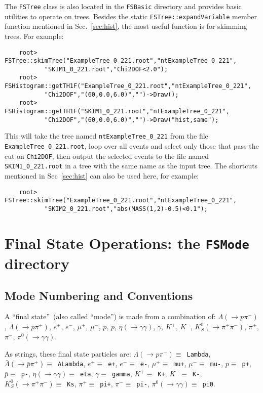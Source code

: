 \documentclass[11pt]{article}
\begin{document}
The {\tt FSTree} class is also located in the {\tt FSBasic} directory and provides basic utilities to operate on trees.  
Besides the static {\tt FSTree::expandVariable} member function mentioned in Sec.~\ref{sec:hist}, the most useful function is for skimming trees.  For example:
\begin{verbatim}
    root> FSTree::skimTree("ExampleTree_0_221.root","ntExampleTree_0_221",
           "SKIM1_0_221.root","Chi2DOF<2.0"); 
    root> FSHistogram::getTH1F("ExampleTree_0_221.root","ntExampleTree_0_221",
           "Chi2DOF","(60,0.0,6.0)","")->Draw();
    root> FSHistogram::getTH1F("SKIM1_0_221.root","ntExampleTree_0_221",
           "Chi2DOF","(60,0.0,6.0)","")->Draw("hist,same");
\end{verbatim}
This will take the tree named {\tt ntExampleTree\_0\_221} from the file {\tt ExampleTree\_0\_221.root}, loop over all events and select only those that pass the cut on {\tt Chi2DOF}, then output the selected events to the file named {\tt SKIM1\_0\_221.root} in a tree with the same name as the input tree.  The shortcuts mentioned in Sec~\ref{sec:hist} can also be used here, for example:
\begin{verbatim}
    root> FSTree::skimTree("ExampleTree_0_221.root","ntExampleTree_0_221",
           "SKIM2_0_221.root","abs(MASS(1,2)-0.5)<0.1"); 
\end{verbatim}


\section{Final State Operations:  the {\tt FSMode} directory}
\label{sec:modes}

\subsection{Mode Numbering and Conventions}
\label{sec:modeconv}

A ``final state''~(also called ``mode'') is made from a combination of: $\Lambda (\to p \pi^-)$, $\bar{\Lambda} (\to \bar{p} \pi^+)$, $e^+$, $e^-$, $\mu^+$, $\mu^-$, $p$, $\bar{p}$, $\eta (\to \gamma\gamma)$, $\gamma$, $K^+$, $K^-$, $K^0_S (\to \pi^+\pi^-)$, $\pi^+$, $\pi^-$, $\pi^0 (\to \gamma\gamma)$.

As strings, these final state particles are:
$\Lambda (\to p \pi^-) \equiv $~{\tt Lambda}, 
$\bar{\Lambda} (\to \bar{p} \pi^+) \equiv $~{\tt ALambda}, 
$e^+ \equiv $~{\tt e+}, 
$e^- \equiv $~{\tt e-}, 
$\mu^+ \equiv $~{\tt mu+},  
$\mu^- \equiv $~{\tt mu-}, 
$p \equiv $~{\tt p+}, 
$\bar{p} \equiv $~{\tt p-}, 
$\eta (\to \gamma\gamma) \equiv $~{\tt eta}, 
$\gamma \equiv $~{\tt gamma}, 
$K^+ \equiv $~{\tt K+}, 
$K^- \equiv $~{\tt K-}, 
$K^0_S (\to \pi^+\pi^-) \equiv $~{\tt Ks}, 
$\pi^+ \equiv $~{\tt pi+}, 
$\pi^- \equiv $~{\tt pi-}, 
$\pi^0 (\to \gamma\gamma) \equiv $~{\tt pi0}.
\end{document}
